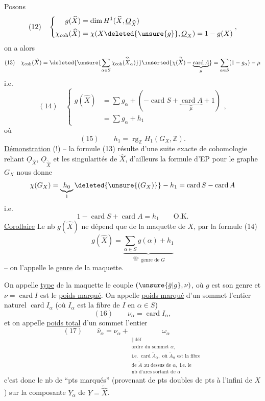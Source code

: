 Posons 
\[
(12)\quad\left\{\begin{aligned}
g(\widehat X)&=\dim H^1(\widehat X,\underline O_{\widehat X})\\
\chi_{\mathrm{coh}}(\widehat X)&=\chi(X\deleted{\unsure{g}},\underline O_X)=1-g(X)
\end{aligned}\right.,
\]
on a alors
\[
(13)\quad\chi_{\mathrm{coh}}(\widehat X)
=\deleted{\unsure{\sum_{\alpha\in S}\chi_{\mathrm{coh}}(\widehat{\widetilde X}_\alpha)}}
\inserted{\chi(\widetilde{\widehat X})-\underbrace{\operatorname{card}A}_{\mu}}
=\sum_{\alpha\in S}(1-g_\alpha)-\mu
\]
i.e.
\[
(14)\quad\left\{\begin{aligned}
g(\widehat X)&=\sum g_\alpha+(-\operatorname{card}S+\underbrace{\operatorname{card}A}_{\mu}+1)\\
&=\sum g_\alpha+h_1
\end{aligned}\right.,
\]
où 
\[
(15)\qquad h_1=\operatorname{rg}_{\mathbb Z}H_1(G_X,\mathbb Z).
\]
\uline{Démonstration}  (!) -- la formule (13) résulte d'une suite exacte  de cohomologie reliant $\underline O_{\widehat X}$, $\underline O_{\widetilde{\widehat X}}$ et les singularités de $\widehat X$, d'ailleurs la formule d'EP pour le graphe $G_X$ nous donne
\[
\chi(G_X)=\underbrace{h_0}_{1}\deleted{\unsure{(G_X)}}-h_1=\operatorname{card}S-\operatorname{card}A
\]
i.e.
\[
1-\operatorname{card}S+\operatorname{card}A=h_1\qquad\text{O.K.}
\]
\uline{Corollaire} Le nb $g(\widehat X)$ ne dépend que de la maquette de $X$, par la formule (14)
\[
g(\widehat X)=\underbrace{\sum_{\alpha\in S}g(\alpha)+h_1}_{\overset{\mathrm{dfn}}{=}\ \text{genre de }G}
\]
-- on l'appelle le \uline{genre} de la maquette.

On appelle \uline{type} de la maquette le couple $(\unsure{\bar g|g},\nu)$, où $g$ est son genre et $\nu=\operatorname{card}I$ est le \uline{poids marqué}. On appelle \uline{poids marqué} d'un sommet l'entier naturel
$\operatorname{card}I_\alpha$ (où $I_\alpha$ est la fibre de $I$ en $\alpha\in S$)
\[
(16)\qquad\nu_\alpha=\operatorname{card}I_\alpha,
\]
et on appelle \uline{poids total} d'un sommet l'entier
\[
(17)\qquad\widehat\nu_\alpha=\nu_\alpha+
\underset{\substack{\Vert\ \mathrm{déf}\\
\text{ordre du sommet }\alpha,\\
\text{i.e. }\operatorname{card}\widetilde A_\alpha,\text{ où }\widetilde A_\alpha\text{ est la fibre}\\
\text{de }\widetilde A\text{ au dessus de }\alpha,\text{ i.e. le}\\
\text{nb d'arcs sortant de }\alpha}}{\omega_\alpha}
\]
c'est donc le nb de ``pts marqués'' (provenant de pts doubles  de pts à l'infini de $X$) sur la composante $Y_\alpha$ de $Y=\widetilde{\widehat X}$.

